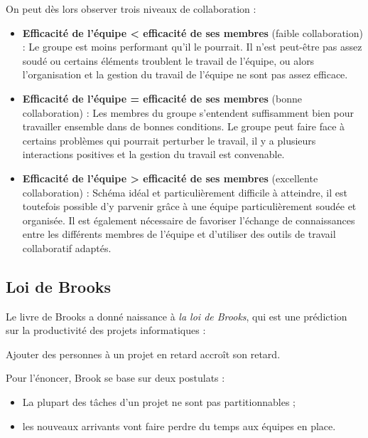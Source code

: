 On peut dès lors observer trois niveaux de collaboration :\\

\begin{itemize}

\item \textbf{Efficacité de l'équipe \textless \: efficacité de ses membres} (faible collaboration) :
Le groupe est moins performant qu'il le pourrait. Il n'est peut-être pas assez soudé ou certains éléments troublent le travail de l'équipe, ou alors l'organisation et la gestion du travail de l'équipe ne sont pas assez efficace.\\

\item \textbf{Efficacité de l'équipe = efficacité de ses membres} (bonne collaboration) :
Les membres du groupe s'entendent suffisamment bien pour travailler ensemble dans de bonnes conditions. Le groupe peut faire face à certains problèmes qui pourrait perturber le travail, il y a plusieurs interactions positives et la gestion du travail est convenable.\\

\item \textbf{Efficacité de l'équipe \textgreater \: efficacité de ses membres} (excellente collaboration) :
Schéma idéal et particulièrement difficile à atteindre, il est toutefois possible d'y parvenir grâce à une équipe particulièrement soudée et organisée. Il est également nécessaire de favoriser l'échange de connaissances entre les différents membres de l'équipe et d'utiliser des outils de travail collaboratif adaptés.

\end{itemize}

\subsection{Loi de Brooks}
Le livre de Brooks a donné naissance à \textit{la loi de Brooks}, qui est une prédiction sur la productivité des projets informatiques :

\begin{Quote}
Ajouter des personnes à un projet en retard accroît son retard.
\end{Quote}

Pour l'énoncer, Brook se base sur deux postulats :
\begin{itemize}
\item La plupart des tâches d'un projet ne sont pas partitionnables ;
\item les nouveaux arrivants vont faire perdre du temps aux équipes en place.
\end{itemize}


